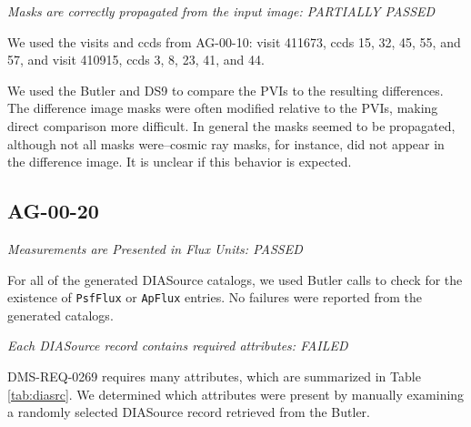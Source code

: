 \documentclass[DM,lsstdraft,STR,toc]{lsstdoc}
\begin{document}
\textit{Masks are correctly propagated from the input image: PARTIALLY PASSED}

We used the visits and ccds from AG-00-10:
visit 411673, ccds 15, 32, 45, 55, and 57, and
visit 410915, ccds 3,  8, 23, 41, and 44.

We used the Butler and DS9 to compare the PVIs to the resulting differences. 
The difference image masks were often modified relative to the PVIs, making 
direct comparison more difficult.  In general the masks seemed to be propagated,
although not all masks were--cosmic ray masks, for instance, did not appear 
in the difference image.  It is unclear if this behavior is expected.


\subsection{AG-00-20}

\textit{Measurements are Presented in Flux Units: PASSED }

For all of the generated DIASource catalogs, we used Butler calls to check for
the existence of \texttt{PsfFlux} or \texttt{ApFlux} entries.  No failures were
reported from the generated catalogs.


\textit{Each DIASource record contains required attributes: FAILED}

DMS-REQ-0269 requires many attributes, which are summarized in Table
\ref{tab:diasrc}.  We determined which attributes were present by manually
examining a randomly selected DIASource record retrieved from the Butler.
\end{document}
